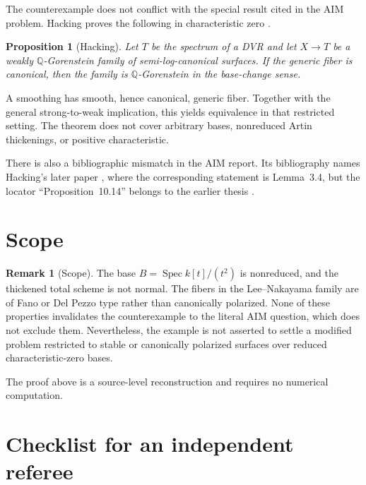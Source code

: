 \documentclass[10pt,reqno]{amsart}
\newtheorem{proposition}[theorem]{Proposition}
\theoremstyle{definition}
\newtheorem{remark}[theorem]{Remark}
\begin{document}
The counterexample does not conflict with the special result cited in the AIM problem. Hacking proves the following in characteristic zero \cite[Proposition~10.14]{HackingThesis}.

\begin{proposition}[Hacking]
Let $T$ be the spectrum of a DVR and let $X\to T$ be a weakly $\mathbb Q$-Gorenstein family of semi-log-canonical surfaces. If the generic fiber is canonical, then the family is $\mathbb Q$-Gorenstein in the base-change sense.
\end{proposition}

A smoothing has smooth, hence canonical, generic fiber. Together with the general strong-to-weak implication, this yields equivalence in that restricted setting. The theorem does not cover arbitrary bases, nonreduced Artin thickenings, or positive characteristic.

There is also a bibliographic mismatch in the AIM report. Its bibliography names Hacking's later paper \cite{HackingPaper}, where the corresponding statement is Lemma~3.4, but the locator ``Proposition~10.14'' belongs to the earlier thesis \cite{HackingThesis}.

\section{Scope}

\begin{remark}[Scope]\label{rem:scope}
The base $B=\operatorname{Spec}k[t]/(t^2)$ is nonreduced, and the thickened total scheme is not normal. The fibers in the Lee--Nakayama family are of Fano or Del Pezzo type rather than canonically polarized. None of these properties invalidates the counterexample to the literal AIM question, which does not exclude them. Nevertheless, the example is not asserted to settle a modified problem restricted to stable or canonically polarized surfaces over reduced characteristic-zero bases.
\end{remark}

The proof above is a source-level reconstruction and requires no numerical computation.

\appendix

\section{Checklist for an independent referee}
\end{document}
